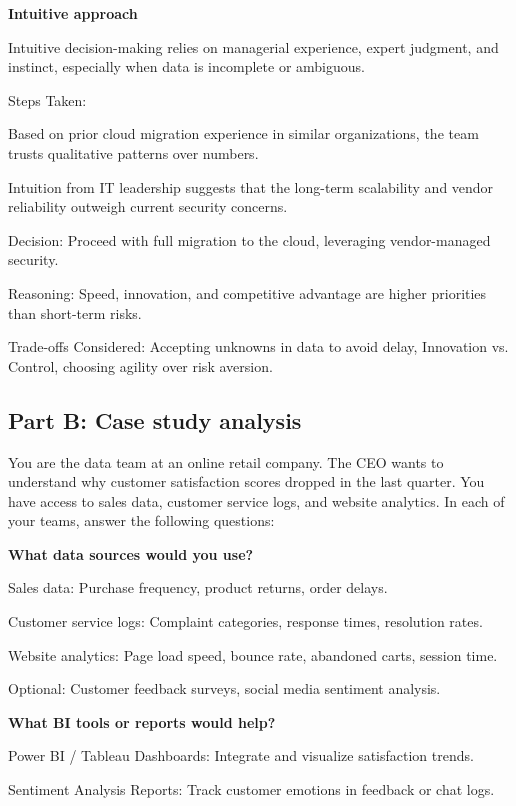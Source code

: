 \bigskip

\noindent\textbf{Intuitive approach}

Intuitive decision-making relies on managerial experience, expert judgment, and instinct, especially when data is incomplete or ambiguous.

Steps Taken:

Based on prior cloud migration experience in similar organizations, the team trusts qualitative patterns over numbers.

Intuition from IT leadership suggests that the long-term scalability and vendor reliability outweigh current security concerns.

Decision: Proceed with full migration to the cloud, leveraging vendor-managed security.

Reasoning: Speed, innovation, and competitive advantage are higher priorities than short-term risks.

Trade-offs Considered: Accepting unknowns in data to avoid delay, Innovation vs. Control, choosing agility over risk aversion.

\subsection{Part B: Case study analysis}

\indent 

You are the data team at an online retail company. The CEO wants to understand why customer satisfaction scores dropped in the last quarter. You have access to sales data, customer service logs, and website analytics. In each of your teams, answer the following questions:

\bigskip 

\noindent\textbf{What data sources would you use?}

Sales data: Purchase frequency, product returns, order delays.

Customer service logs: Complaint categories, response times, resolution rates.

Website analytics: Page load speed, bounce rate, abandoned carts, session time.

Optional: Customer feedback surveys, social media sentiment analysis.

\bigskip

\noindent\textbf{What BI tools or reports would help?}

Power BI / Tableau Dashboards: Integrate and visualize satisfaction trends.

Sentiment Analysis Reports: Track customer emotions in feedback or chat logs.

